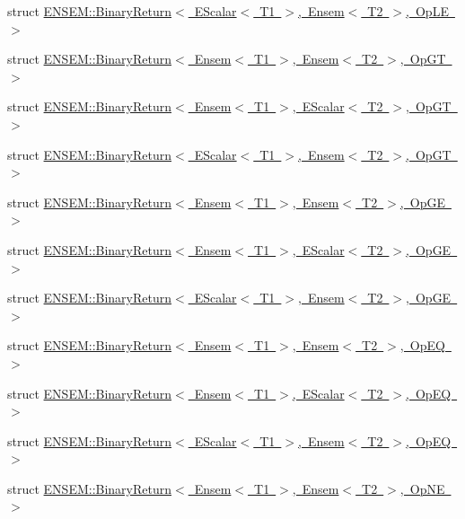 \begin{DoxyCompactItemize}
struct \mbox{\hyperlink{structENSEM_1_1BinaryReturn_3_01EScalar_3_01T1_01_4_00_01Ensem_3_01T2_01_4_00_01OpLE_01_4}{E\+N\+S\+E\+M\+::\+Binary\+Return$<$ E\+Scalar$<$ T1 $>$, Ensem$<$ T2 $>$, Op\+L\+E $>$}}
\item 
struct \mbox{\hyperlink{structENSEM_1_1BinaryReturn_3_01Ensem_3_01T1_01_4_00_01Ensem_3_01T2_01_4_00_01OpGT_01_4}{E\+N\+S\+E\+M\+::\+Binary\+Return$<$ Ensem$<$ T1 $>$, Ensem$<$ T2 $>$, Op\+G\+T $>$}}
\item 
struct \mbox{\hyperlink{structENSEM_1_1BinaryReturn_3_01Ensem_3_01T1_01_4_00_01EScalar_3_01T2_01_4_00_01OpGT_01_4}{E\+N\+S\+E\+M\+::\+Binary\+Return$<$ Ensem$<$ T1 $>$, E\+Scalar$<$ T2 $>$, Op\+G\+T $>$}}
\item 
struct \mbox{\hyperlink{structENSEM_1_1BinaryReturn_3_01EScalar_3_01T1_01_4_00_01Ensem_3_01T2_01_4_00_01OpGT_01_4}{E\+N\+S\+E\+M\+::\+Binary\+Return$<$ E\+Scalar$<$ T1 $>$, Ensem$<$ T2 $>$, Op\+G\+T $>$}}
\item 
struct \mbox{\hyperlink{structENSEM_1_1BinaryReturn_3_01Ensem_3_01T1_01_4_00_01Ensem_3_01T2_01_4_00_01OpGE_01_4}{E\+N\+S\+E\+M\+::\+Binary\+Return$<$ Ensem$<$ T1 $>$, Ensem$<$ T2 $>$, Op\+G\+E $>$}}
\item 
struct \mbox{\hyperlink{structENSEM_1_1BinaryReturn_3_01Ensem_3_01T1_01_4_00_01EScalar_3_01T2_01_4_00_01OpGE_01_4}{E\+N\+S\+E\+M\+::\+Binary\+Return$<$ Ensem$<$ T1 $>$, E\+Scalar$<$ T2 $>$, Op\+G\+E $>$}}
\item 
struct \mbox{\hyperlink{structENSEM_1_1BinaryReturn_3_01EScalar_3_01T1_01_4_00_01Ensem_3_01T2_01_4_00_01OpGE_01_4}{E\+N\+S\+E\+M\+::\+Binary\+Return$<$ E\+Scalar$<$ T1 $>$, Ensem$<$ T2 $>$, Op\+G\+E $>$}}
\item 
struct \mbox{\hyperlink{structENSEM_1_1BinaryReturn_3_01Ensem_3_01T1_01_4_00_01Ensem_3_01T2_01_4_00_01OpEQ_01_4}{E\+N\+S\+E\+M\+::\+Binary\+Return$<$ Ensem$<$ T1 $>$, Ensem$<$ T2 $>$, Op\+E\+Q $>$}}
\item 
struct \mbox{\hyperlink{structENSEM_1_1BinaryReturn_3_01Ensem_3_01T1_01_4_00_01EScalar_3_01T2_01_4_00_01OpEQ_01_4}{E\+N\+S\+E\+M\+::\+Binary\+Return$<$ Ensem$<$ T1 $>$, E\+Scalar$<$ T2 $>$, Op\+E\+Q $>$}}
\item 
struct \mbox{\hyperlink{structENSEM_1_1BinaryReturn_3_01EScalar_3_01T1_01_4_00_01Ensem_3_01T2_01_4_00_01OpEQ_01_4}{E\+N\+S\+E\+M\+::\+Binary\+Return$<$ E\+Scalar$<$ T1 $>$, Ensem$<$ T2 $>$, Op\+E\+Q $>$}}
\item 
struct \mbox{\hyperlink{structENSEM_1_1BinaryReturn_3_01Ensem_3_01T1_01_4_00_01Ensem_3_01T2_01_4_00_01OpNE_01_4}{E\+N\+S\+E\+M\+::\+Binary\+Return$<$ Ensem$<$ T1 $>$, Ensem$<$ T2 $>$, Op\+N\+E $>$}}

\end{DoxyCompactItemize}
